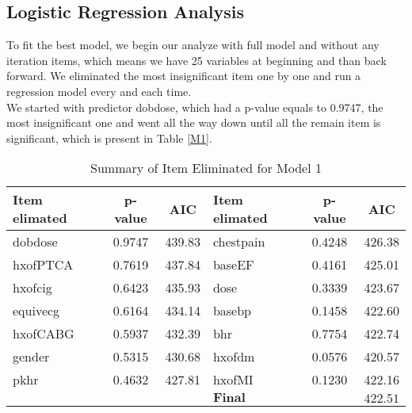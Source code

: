 \documentclass[a4paper,12pt]{article}
\begin{document}
 \subsection{Logistic Regression Analysis}
 To fit the best model, we begin our analyze with full model and without any iteration items, which means we have 25 variables at beginning and than back forward. We eliminated the most insignificant item one by one and run a regression model every and each time.\\
 We started with predictor dobdose, which had a p-value equals to 0.9747, the most insignificant one and went all the way down until all the remain item is significant, which is present in Table \ref{M1}.
   \begin{table}[htbp]
     \centering
     \caption{Summary of Item Eliminated for Model 1}
       \begin{tabular}{lcclcc}
       \toprule[1.5pt]
       Item elimated  & p-value & AIC   & Item elimated  & p-value & AIC \\
       \midrule
       dobdose & 0.9747 & 439.83 & chestpain & 0.4248 & 426.38 \\
       hxofPTCA & 0.7619 & 437.84 & baseEF & 0.4161 & 425.01 \\
       hxofcig & 0.6423 & 435.93 & dose  & 0.3339 & 423.67 \\
       equivecg & 0.6164 & 434.14 & basebp & 0.1458 & 422.60 \\
       hxofCABG & 0.5937 & 432.39 & bhr   & 0.7754 & 422.74 \\
       gender & 0.5315 & 430.68 & hxofdm & 0.0576 & 420.57 \\
       pkhr  & 0.4632 & 427.81 & hxofMI & 0.1230 & 422.16 \\
       \midrule
             &       &       & $\mathbf{Final}$ &       & $\mathbf{422.51}$ \\
       \bottomrule[1.5pt]
       \end{tabular}%
     \label{M1_E}%
   \end{table}%
\end{document}

